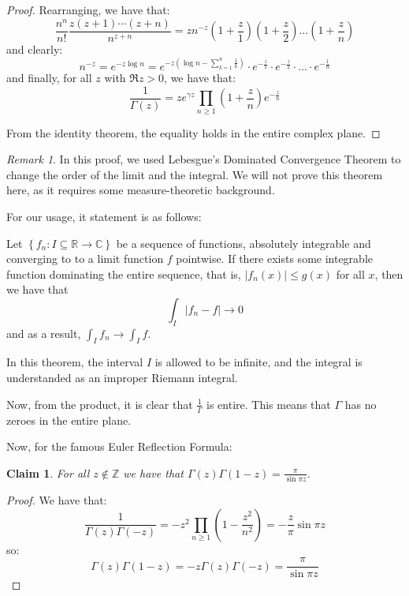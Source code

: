 \documentclass[11pt]{article} %
\newtheorem{claim}[theorem]{Claim}
\theoremstyle{definition}
\theoremstyle{remark}
\newtheorem*{remark}{Remark}
\newcommand{\abs}[1]{\left|#1\right|}
\begin{document}
\begin{proof}
Rearranging, we have that:
\[ \frac{n^n}{n!}\frac{z\left(z+1\right)\cdots\left(z+n\right)}{n^{z+n}} = z n^{-z} \left(1 + \frac{z}{1}\right)\left(1 + \frac{z}{2}\right)\dots\left(1 + \frac{z}{n}\right)\]
and clearly:
\[n^{-z} = e^{-z\log n} = e^{-z\left(\log n - \sum_{k=1}^n\frac{1}{k}\right)} \cdot e^{-\frac{z}{1}} \cdot e^{-\frac{z}{2}}\cdot \dots \cdot e^{-\frac{1}{n}}\]
and finally, for all $z$ with $\Re z > 0$, we have that:
\[ \frac{1}{\Gamma\left(z\right)} = ze^{\gamma z}\prod_{n\geq1}\left(1+\frac{z}{n}\right)e^{-\frac{z}{n}}\]

From the identity theorem, the equality holds in the entire complex plane.
\end{proof}

\begin{remark}
In this proof, we used Lebesgue's Dominated Convergence Theorem to change the order of the limit and the integral. We will not prove this theorem here, as it requires some measure-theoretic background.

For our usage, it statement is as follows:

Let $\left\{f_n: I \subseteq \mathbb{R} \to \mathbb{C}\right\}$ be a sequence of functions, absolutely integrable and converging to to a limit function $f$ pointwise. If there exists some integrable function dominating the entire sequence, that is, $\abs{f_n\left(x\right)} \leq g\left(x\right)$ for all $x$, then we have that 
\[ \int_I \abs{f_n - f} \to 0\]
and as a result, $\int_I f_n \to \int_I f$.

In this theorem, the interval $I$ is allowed to be infinite, and the integral is understanded as an improper Riemann integral.
\end{remark}

Now, from the product, it is clear that $\frac{1}{\Gamma}$ is entire. This means that $\Gamma$ has no zeroes in the entire plane.

Now, for the famous Euler Reflection Formula:

\begin{claim}
For all $z \notin \mathbb{Z}$ we have that $\Gamma\left(z\right)\Gamma\left(1-z\right) = \frac{\pi}{\sin\pi z}$.
\end{claim}

\begin{proof}
We have that:
\[
\frac{1}{\Gamma\left(z\right)\Gamma\left(-z\right)} = -z^2 \prod_{n\geq 1}\left(1 - \frac{z^2}{n^2}\right) = -\frac{z}{\pi}\sin\pi z
\]
so:
\[ \Gamma\left(z\right)\Gamma\left(1-z\right) = -z\Gamma\left(z\right)\Gamma\left(-z\right) = \frac{\pi}{\sin\pi z} \]
\end{proof}
\end{document}
